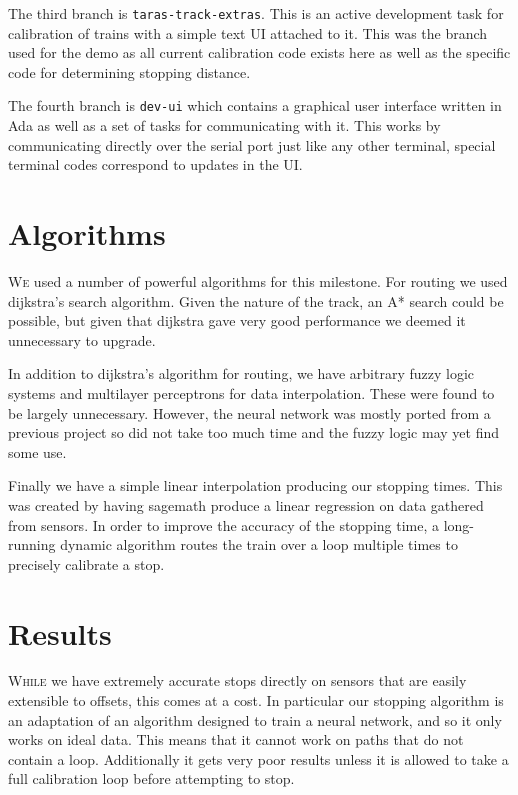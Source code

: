 \documentclass{amsart} \usepackage{amsmath} \usepackage{upgreek}
\begin{document}
The third branch is \texttt{taras-track-extras}. This is an active development
task for calibration of trains with a simple text UI attached to it. This was
the branch used for the demo as all current calibration code exists here as well
as the specific code for determining stopping distance.

The fourth branch is \texttt{dev-ui} which contains a graphical user interface
written in Ada as well as a set of tasks for communicating with it. This works
by communicating directly over the serial port just like any other terminal,
special terminal codes correspond to updates in the UI.

\section*{Algorithms}

\textsc{We} used a number of powerful algorithms for this milestone. For routing
we used dijkstra's search algorithm. Given the nature of the track, an A* search
could be possible, but given that dijkstra gave very good performance we deemed
it unnecessary to upgrade.

In addition to dijkstra's algorithm for routing, we have arbitrary fuzzy logic
systems and multilayer perceptrons for data interpolation. These were found to
be largely unnecessary. However, the neural network was mostly ported from a
previous project so did not take too much time and the fuzzy logic may yet find
some use.

Finally we have a simple linear interpolation producing our stopping times. This
was created by having sagemath produce a linear regression on data gathered from
sensors. In order to improve the accuracy of the stopping time, a long-running
dynamic algorithm routes the train over a loop multiple times to precisely
calibrate a stop.

\section*{Results}

\textsc{While} we have extremely accurate stops directly on sensors that are easily
extensible to offsets, this comes at a cost. In particular our stopping
algorithm is an adaptation of an algorithm designed to train a neural network,
and so it only works on ideal data. This means that it cannot work on paths that
do not contain a loop. Additionally it gets very poor results unless it is
allowed to take a full calibration loop before attempting to stop.
\end{document}
